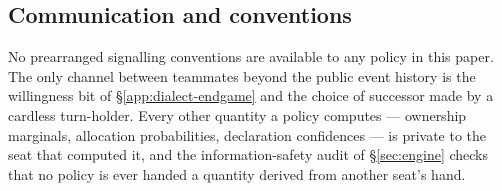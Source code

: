 \subsection{Communication and conventions}
\label{app:dialect-conventions}

No prearranged signalling conventions are available to any policy in this paper.
The only channel between teammates beyond the public event history is the
willingness bit of \S\ref{app:dialect-endgame} and the choice of successor made
by a cardless turn-holder. Every other quantity a policy computes --- ownership
marginals, allocation probabilities, declaration confidences --- is private to
the seat that computed it, and the information-safety audit of
\S\ref{sec:engine} checks that no policy is ever handed a quantity derived from
another seat's hand.
